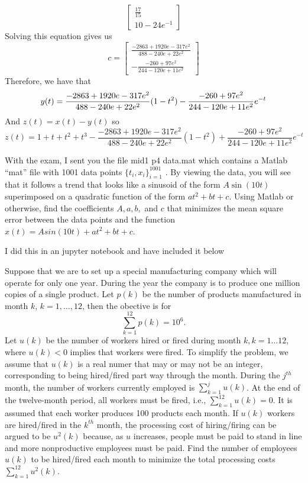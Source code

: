 \documentclass{exam}
\begin{document}
\begin{solution}
\[\begin{bmatrix}
        \frac{17}{15} \\
        10 - 24e^{-1}
      \end{bmatrix}
    \]
    Solving this equation gives us
    \[
      c = 
      \begin{bmatrix}
        \frac{-2863 + 1920e - 317e^2}{488 - 240e + 22e^2} \\
        -\frac{-260 + 97e^2}{244 - 120e + 11e^2}
      \end{bmatrix}
    \]
    Therefore, we have that
    \[ y(t) = \frac{-2863 + 1920e - 317e^2}{488 - 240e + 22e^2}(1-t^2) -  \frac{-260 + 97e^2}{244 - 120e + 11e^2}e^{-t} \\
    \]
    And $z(t) = x(t) - y(t)$ so
    \[
      z(t) = 1 + t + t^2 + t^3 - \frac{-2863 + 1920e - 317e^2}{488 - 240e + 22e^2}(1-t^2) + \frac{-260 + 97e^2}{244 - 120e + 11e^2}e^{-t} 
    \]
  \end{solution}
  \begin{problem}
    With the exam, I sent you the file mid1 p4 data.mat which contains a Matlab “mat” file with 1001 data points $\{t_i, x_i\}^{1001}_{i=1}$ . By viewing the data, you will see that it follows a trend that looks like a sinusoid of the form $A\sin(10t)$ superimposed on a quadratic function of the form $at^2 + bt + c$. Using Matlab or otherwise, find the coefficients $A, a, b,$ and $c$ that minimizes the mean square error between the data points and the function $\hat{x}(t) = A sin(10t) + at^2 + bt + c$.
  \end{problem}

  \begin{solution}
    I did this in an jupyter notebook and have included it below
    
  \end{solution}

  \begin{problem}
    Suppose that we are to set up a special manufacturing company which will operate for only one year. During the year the company is to produce one million copies of a single product. Let $p(k)$ be the number of products manufactured in month $k$, $k = 1, \dots, 12$, then the obective is for
    \[
      \sum_{k=1}^{12} p(k) = 10^6.
    \]
    Let $u(k)$ be the number of workers hired or fired during month $k, k = 1 \dots 12$, where $u(k) < 0$ implies that workers were fired. To simplify the problem, we assume that $u(k)$ is a real numer that may or may not be an integer, corresponding to being hired/fired part way through the month. During the $j^{th}$ month, the  number of workers currently employed is $\sum_{k=1}^j u(k)$. At the end of the twelve-month period, all workers must be fired, i.e., $\sum_{k=1}^{12}u(k) = 0$. It is assumed that each worker produces 100 products each month. If $u(k)$ workers are hired/fired in the $k^{th}$ month, the processing cost of hiring/firing can be argued to be $u^2(k)$ because, as $u$ increases, people must be paid to stand in line and more nonproductive employees must be paid. Find the number of employees $u(k)$ to be hired/fired each month to minimize the total processing costs $\sum_{k=1}^{12} u^2(k)$.
  \end{problem}
\end{document}
